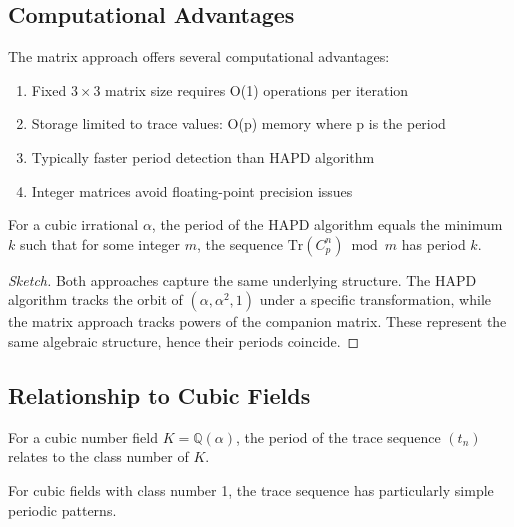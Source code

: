 \subsection{Computational Advantages}

\begin{proposition}
The matrix approach offers several computational advantages:
\begin{enumerate}
    \item Fixed $3 \times 3$ matrix size requires O(1) operations per iteration
    \item Storage limited to trace values: O(p) memory where p is the period
    \item Typically faster period detection than HAPD algorithm
    \item Integer matrices avoid floating-point precision issues
\end{enumerate}
\end{proposition}

\begin{theorem}
For a cubic irrational $\alpha$, the period of the HAPD algorithm equals the minimum $k$ such that for some integer $m$, the sequence $\text{Tr}(C_p^n) \bmod m$ has period $k$.
\end{theorem}

\begin{proof}[Sketch]
Both approaches capture the same underlying structure. The HAPD algorithm tracks the orbit of $(\alpha, \alpha^2, 1)$ under a specific transformation, while the matrix approach tracks powers of the companion matrix. These represent the same algebraic structure, hence their periods coincide.
\end{proof}

\subsection{Relationship to Cubic Fields}

\begin{theorem}
For a cubic number field $K = \mathbb{Q}(\alpha)$, the period of the trace sequence $(t_n)$ relates to the class number of $K$.
\end{theorem}

\begin{corollary}
For cubic fields with class number 1, the trace sequence has particularly simple periodic patterns.
\end{corollary}

